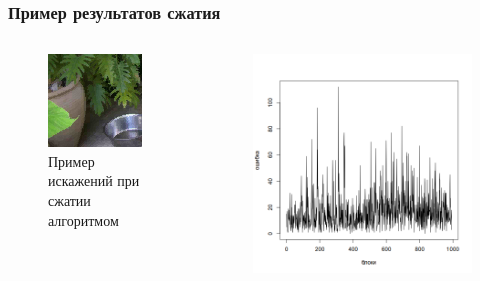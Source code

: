 \documentclass{beamer}
\begin{document}
\begin{frame}
\frametitle{Пример результатов сжатия}

\begin{columns}
  \begin{column}{0.45\textwidth}
    \begin{figure}
      \includegraphics[width=\textwidth]{img/field/algo}
      \caption{Пример искажений при сжатии алгоритмом}
    \end{figure}
  \end{column}
  \begin{column}{0.45\textwidth}
    \begin{figure}
      \includegraphics[width=\textwidth]{img/field/errplot_algo}

\end{figure}
\end{column}
\end{columns}
\end{frame}
\end{document}
